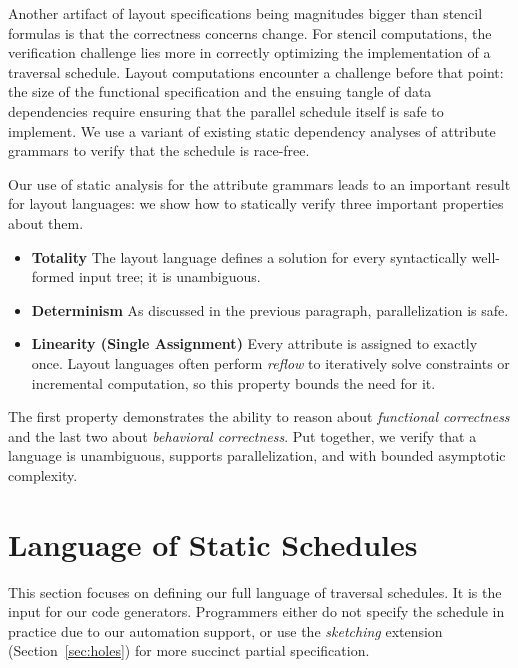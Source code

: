 Another artifact of layout specifications being magnitudes bigger than stencil formulas is that the correctness concerns change. For stencil computations, the verification challenge lies more in correctly optimizing the implementation of a traversal schedule. Layout computations encounter a challenge before that point: the size of the functional specification and the ensuing tangle of data dependencies require ensuring  that the parallel schedule itself is safe to implement. We use a variant of existing static dependency analyses of attribute grammars to verify that the schedule is race-free. 

Our use of static analysis for the attribute grammars leads to an important result for layout languages: we show how to statically verify three important properties about them.  
\begin{itemize}
\item \textbf{Totality} The layout language defines a solution for every syntactically well-formed input tree; it is unambiguous. 
\item \textbf{Determinism} As discussed  in the previous paragraph, parallelization is safe.
\item \textbf{Linearity (Single Assignment)} Every attribute is assigned to exactly once. Layout languages often perform \emph{reflow} to iteratively solve constraints or incremental computation, so this property bounds the need for it. 
\end{itemize}
The first property demonstrates the ability to reason about \emph{functional correctness} and the last two about \emph{behavioral correctness}. Put together, we verify that a language is unambiguous, supports parallelization, and with bounded asymptotic complexity. 


\section{Language of Static Schedules}

This section focuses on defining our full language of traversal schedules. It is the input for our code generators. Programmers either do not specify the schedule in practice due to our automation support, or use the \emph{sketching} extension (Section~\ref{sec:holes}) for more succinct partial specification.

